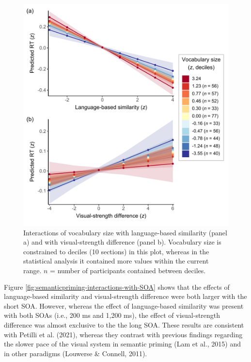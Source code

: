 \documentclass[
  12pt,
  man,floatsintext]{apa7}
\begin{document}
\begin{figure}

{\centering \includegraphics[width=0.85\linewidth]{../semanticpriming/frequentist_analysis/plots/semanticpriming-interactions-with-vocabulary-size} 

}

\caption{Interactions of vocabulary size with language-based similarity (panel a) and with visual-strength difference (panel b). Vocabulary size is constrained to deciles (10 sections) in this plot, whereas in the statistical analysis it contained more values within the current range. \(n\) = number of participants contained between deciles.}\label{fig:semanticpriming-interactions-with-vocabulary-size}
\end{figure}

Figure \ref{fig:semanticpriming-interactions-with-SOA} shows that the effects of language-based similarity and visual-strength difference were both larger with the short SOA. However, whereas the effect of language-based similarity was present with both SOAs (i.e., 200 ms and 1,200 ms), the effect of visual-strength difference was almost exclusive to the the long SOA. These results are consistent with Petilli et al. (2021), whereas they contrast with previous findings regarding the slower pace of the visual system in semantic priming (Lam et al., 2015) and in other paradigms (Louwerse \& Connell, 2011).
\end{document}
